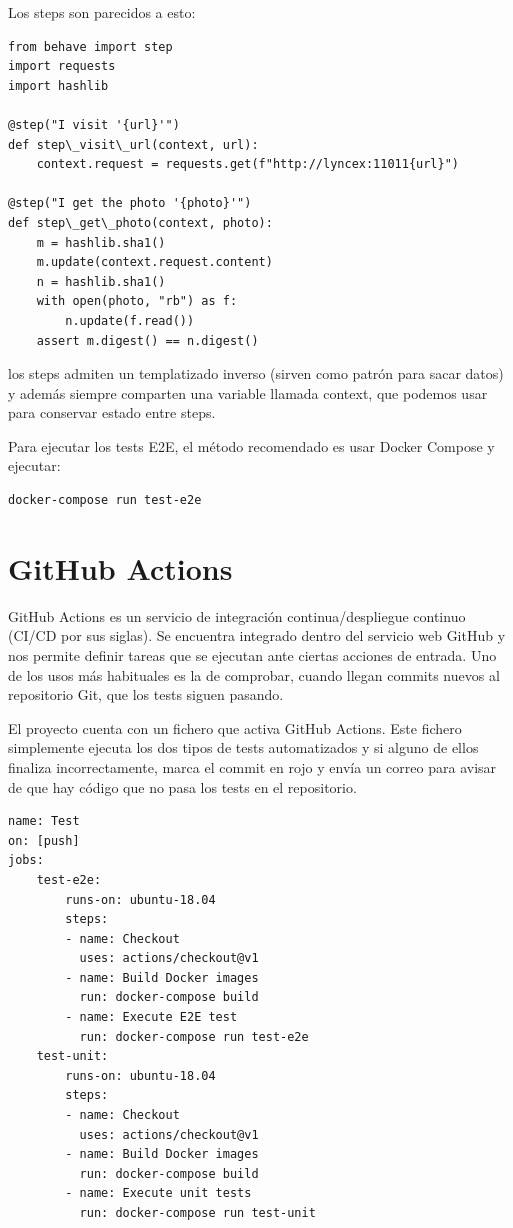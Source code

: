 \documentclass[12pt]{report} %
\begin{document}
Los steps son parecidos a esto:
\begin{lstlisting}
from behave import step
import requests
import hashlib

@step("I visit '{url}'")
def step\_visit\_url(context, url):
    context.request = requests.get(f"http://lyncex:11011{url}")

@step("I get the photo '{photo}'")
def step\_get\_photo(context, photo):
    m = hashlib.sha1()
    m.update(context.request.content)
    n = hashlib.sha1()
    with open(photo, "rb") as f:
        n.update(f.read())
    assert m.digest() == n.digest()
\end{lstlisting}

los steps admiten un templatizado inverso (sirven como patrón para sacar datos) y además siempre comparten una variable llamada context, que podemos usar para conservar estado entre steps.

Para ejecutar los tests E2E, el método recomendado es usar Docker Compose y ejecutar:

\begin{verbatim}
docker-compose run test-e2e
\end{verbatim}

\section{GitHub Actions}

GitHub Actions es un servicio de integración continua/despliegue continuo (CI/CD por sus siglas). Se encuentra integrado dentro del servicio web GitHub y nos permite definir tareas que se ejecutan ante ciertas acciones de entrada. Uno de los usos más habituales es la de comprobar, cuando llegan commits nuevos al repositorio Git, que los tests siguen pasando.

El proyecto cuenta con un fichero que activa GitHub Actions. Este fichero simplemente ejecuta los dos tipos de tests automatizados y si alguno de ellos finaliza incorrectamente, marca el commit en rojo y envía un correo para avisar de que hay código que no pasa los tests en el repositorio.

\begin{lstlisting}
name: Test
on: [push]
jobs:
    test-e2e:
        runs-on: ubuntu-18.04
        steps:
        - name: Checkout
          uses: actions/checkout@v1
        - name: Build Docker images
          run: docker-compose build
        - name: Execute E2E test
          run: docker-compose run test-e2e
    test-unit:
        runs-on: ubuntu-18.04
        steps:
        - name: Checkout
          uses: actions/checkout@v1
        - name: Build Docker images
          run: docker-compose build
        - name: Execute unit tests
          run: docker-compose run test-unit
\end{lstlisting}
\end{document}
